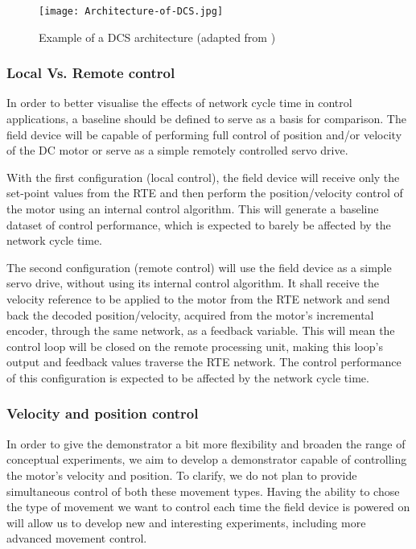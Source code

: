 \begin{figure}[htp]
	\centering
	\texttt{[image: Architecture-of-DCS.jpg]}
	\caption{Example of a DCS architecture (adapted from \cite{misc:dcs-architecture})}
	\label{fig:dcs-architecture}
\end{figure}

\subsubsection{Local Vs. Remote control} \label{subsec:local_remote}

In order to better visualise the effects of network cycle time in control applications, a baseline should be defined to serve as a basis for comparison.
The field device will be capable of performing full control of position and/or velocity of the DC motor or serve as a simple remotely controlled servo drive.

With the first configuration (local control), the field device will receive only the set-point values from the RTE and then perform the position/velocity control of the motor using an internal control algorithm.
This will generate a baseline dataset of control performance, which is expected to barely be affected by the network cycle time.

The second configuration (remote control) will use the field device as a simple servo drive, without using its internal control algorithm.
It shall receive the velocity reference to be applied to the motor from the RTE network and send back the decoded position/velocity, acquired from the motor's incremental encoder, through the same network, as a feedback variable.
This will mean the control loop will be closed on the remote processing unit, making this loop's output and feedback values traverse the RTE network.
The control performance of this configuration is expected to be affected by the network cycle time.

\subsubsection{Velocity and position control}

In order to give the demonstrator a bit more flexibility and broaden the range of conceptual experiments, we aim to develop a demonstrator capable of controlling the motor's velocity and position.
To clarify, we do not plan to provide simultaneous control of both these movement types.
Having the ability to chose the type of movement we want to control each time the field device is powered on will allow us to develop new and interesting experiments, including more advanced movement control.
